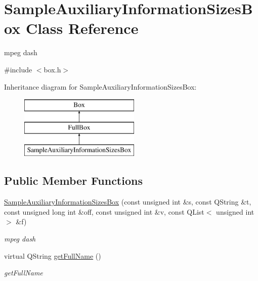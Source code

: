 \hypertarget{class_sample_auxiliary_information_sizes_box}{\section{Sample\-Auxiliary\-Information\-Sizes\-Box Class Reference}
\label{class_sample_auxiliary_information_sizes_box}
}


mpeg dash  




{\ttfamily \#include $<$box.\-h$>$}

Inheritance diagram for Sample\-Auxiliary\-Information\-Sizes\-Box\-:\begin{figure}[H]
\begin{center}
\leavevmode
\includegraphics[height=3.000000cm]{class_sample_auxiliary_information_sizes_box}
\end{center}
\end{figure}
\subsection*{Public Member Functions}
\begin{DoxyCompactItemize}
\item 
\hypertarget{class_sample_auxiliary_information_sizes_box_a5d9f540fa10208962f455fc666965434}{\hyperlink{class_sample_auxiliary_information_sizes_box_a5d9f540fa10208962f455fc666965434}{Sample\-Auxiliary\-Information\-Sizes\-Box} (const unsigned int \&s, const Q\-String \&t, const unsigned long int \&off, const unsigned int \&v, const Q\-List$<$ unsigned int $>$ \&f)}\label{class_sample_auxiliary_information_sizes_box_a5d9f540fa10208962f455fc666965434}

\begin{DoxyCompactList}\small\item\em mpeg dash \end{DoxyCompactList}\item 
virtual Q\-String \hyperlink{class_sample_auxiliary_information_sizes_box_af7c35b3682bb2ab65a0bf5b9ef58dd3e}{get\-Full\-Name} ()
\begin{DoxyCompactList}\small\item\em get\-Full\-Name \end{DoxyCompactList}\end{DoxyCompactItemize}
